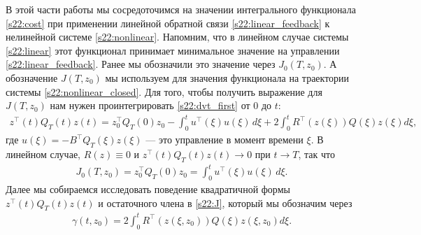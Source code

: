 \documentclass[../main.tex]{subfiles}
\begin{document}
В этой части работы мы сосредоточимся на значении интегрального функционала \eqref{s22:cost} при применении линейной обратной связи \eqref{s22:linear_feedback} к нелинейной системе \eqref{s22:nonlinear}.
Напомним, что в линейном случае системы \eqref{s22:linear} этот функционал принимает минимальное значение на управлении \eqref{s22:linear_feedback}.
Ранее мы обозначили это значение через $J_0(T,z_0)$.
А обозначение $J(T,z_0)$ мы используем для значения функционала на траектории системы \eqref{s22:nonlinear_closed}. 
Для того, чтобы получить выражение для $J(T,z_0)$ нам нужен проинтегрировать  \eqref{s22:dvt_first} от $0$ до $t$:
\begin{gather}\label{s22:J}
    z^{\top}(t) Q_T(t)z(t) = z_0^{\top} Q_T(0)z_0 - \int_{0}^{t} u^{\top}(\xi)  u(\xi) \, d\xi + 2\int_{0}^{t}  R^{\top}(z(\xi))Q(\xi) z(\xi) d\xi,
\end{gather}
    где $ u(\xi) = -B^{\top} Q_T(\xi) z(\xi)$ --- это управление в момент времени $\xi$. 
В линейном случае, $R(z) \equiv 0$ и $z^{\top}(t) Q_T(t)z(t) \to 0 $ при $t \to T$, так что
\begin{gather*}
    J_0(T,z_0) = z_0^{\top} Q_T(0)z_0 = \int_{0}^{t} u^{\top}(\xi)  u(\xi) \, d\xi.
\end{gather*}
Далее мы собираемся исследовать поведение квадратичной формы $z^{\top}(t) Q_T(t)z(t) $ и остаточного члена в \eqref{s22:J}, который мы обозначим через
\begin{gather*}
            \gamma (t,z_0) = 
         2\int_{0}^{t}  R^{\top}(z(\xi,z_0))Q(\xi) z(\xi,z_0) d\xi.
\end{gather*}
\end{document}
